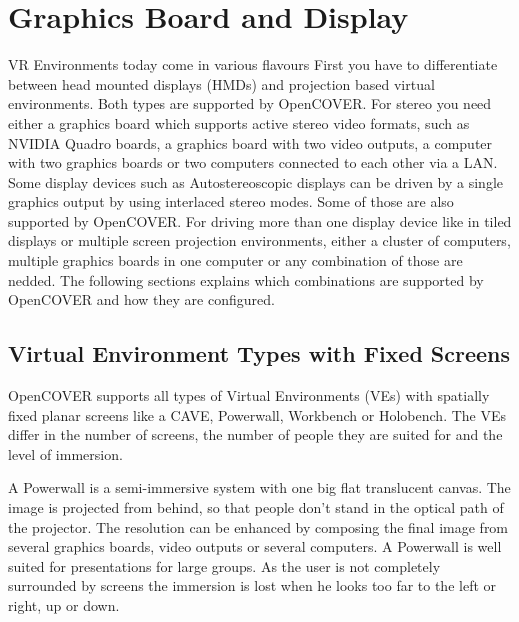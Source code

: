 \begin{htmlonly}

\end{htmlonly}



\startdocument
\chapter{Graphics Board and Display}
\label{label_chapter_display}

VR Environments today come in various flavours  First you have to differentiate between head mounted displays (HMDs) and 
projection based virtual environments. Both types are supported by OpenCOVER.
For stereo you need either a graphics board which supports active stereo video
formats, such as NVIDIA Quadro boards, a graphics board with two video outputs, a computer with
two graphics boards or two computers connected to each other via a LAN.
Some display devices such as Autostereoscopic displays can be driven by a single graphics output by using interlaced
stereo modes. Some of those are also supported by OpenCOVER.
For driving more than one display device like in tiled displays or multiple screen projection environments, either a cluster of computers, 
multiple graphics boards in one computer or any combination of those are nedded.
The following sections explains which combinations are supported by OpenCOVER
and how they are configured.


\section{Virtual Environment Types with Fixed Screens}
\label{label_section_vetypes}

OpenCOVER supports all types of Virtual Environments (VEs) with spatially
fixed  planar screens like a CAVE, Powerwall, Workbench or Holobench.
The VEs differ in the number of screens, the number of people they are suited for
and the level of immersion.

A Powerwall is a semi-immersive system with one big flat translucent canvas. 
The image is projected from behind, so that people don't stand in the optical path
of the projector.
The resolution can be enhanced by composing the final image from several graphics
boards, video outputs or several computers. A Powerwall is well suited
for presentations for large groups. As the user is not completely surrounded by screens
the immersion is lost when he looks too far to the left or right, up or down.

